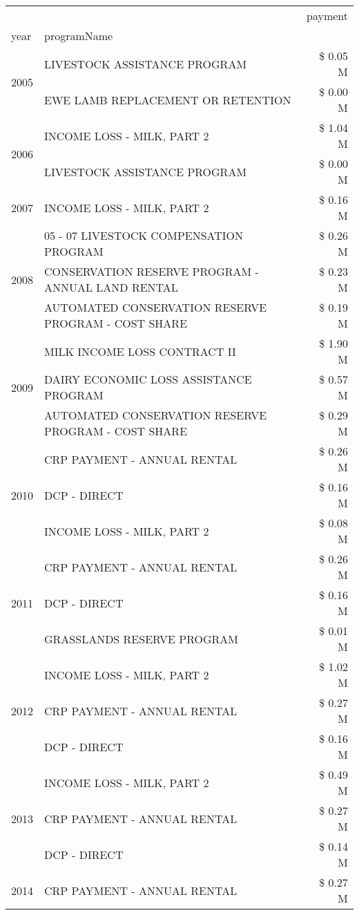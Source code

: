 \begin{tabular}{llr}
\toprule
 &  & payment \\
year & programName &  \\
\midrule
\multirow[t]{2}{*}{2005} & LIVESTOCK ASSISTANCE PROGRAM & \$ 0.05 M \\
 & EWE LAMB REPLACEMENT OR RETENTION & \$ 0.00 M \\
\cline{1-3}
\multirow[t]{2}{*}{2006} & INCOME LOSS - MILK, PART 2 & \$ 1.04 M \\
 & LIVESTOCK ASSISTANCE PROGRAM & \$ 0.00 M \\
\cline{1-3}
2007 & INCOME LOSS - MILK, PART 2 & \$ 0.16 M \\
\cline{1-3}
\multirow[t]{3}{*}{2008} & 05 - 07 LIVESTOCK COMPENSATION PROGRAM & \$ 0.26 M \\
 & CONSERVATION RESERVE PROGRAM - ANNUAL LAND RENTAL & \$ 0.23 M \\
 & AUTOMATED CONSERVATION RESERVE PROGRAM - COST SHARE & \$ 0.19 M \\
\cline{1-3}
\multirow[t]{3}{*}{2009} & MILK INCOME LOSS CONTRACT II & \$ 1.90 M \\
 & DAIRY ECONOMIC LOSS ASSISTANCE PROGRAM & \$ 0.57 M \\
 & AUTOMATED CONSERVATION RESERVE PROGRAM - COST SHARE & \$ 0.29 M \\
\cline{1-3}
\multirow[t]{3}{*}{2010} & CRP PAYMENT - ANNUAL RENTAL & \$ 0.26 M \\
 & DCP - DIRECT & \$ 0.16 M \\
 & INCOME LOSS - MILK, PART 2 & \$ 0.08 M \\
\cline{1-3}
\multirow[t]{3}{*}{2011} & CRP PAYMENT - ANNUAL RENTAL & \$ 0.26 M \\
 & DCP - DIRECT & \$ 0.16 M \\
 & GRASSLANDS RESERVE PROGRAM & \$ 0.01 M \\
\cline{1-3}
\multirow[t]{3}{*}{2012} & INCOME LOSS - MILK, PART 2 & \$ 1.02 M \\
 & CRP PAYMENT - ANNUAL RENTAL & \$ 0.27 M \\
 & DCP - DIRECT & \$ 0.16 M \\
\cline{1-3}
\multirow[t]{3}{*}{2013} & INCOME LOSS - MILK, PART 2 & \$ 0.49 M \\
 & CRP PAYMENT - ANNUAL RENTAL & \$ 0.27 M \\
 & DCP - DIRECT & \$ 0.14 M \\
\cline{1-3}
\multirow[t]{3}{*}{2014} & CRP PAYMENT - ANNUAL RENTAL & \$ 0.27 M \\

\end{tabular}
